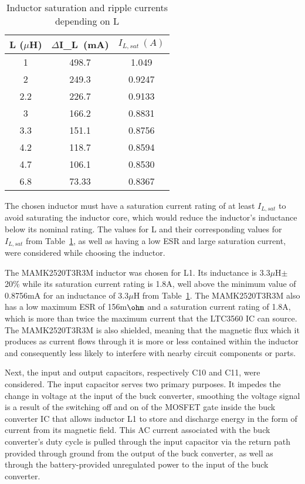 \begin{table}[H]
\centering
\caption{Inductor saturation and ripple currents depending on L}
\label{tab:inductor_value}
\begin{tabular}{|c|c|c|}
\hline
L (${\mu}$H) & ${\Delta}$I_L~(mA) & $I_{L,sat}~(A)$ \\ \hline
1            & 498.7         & 1.049          \\ \hline
2            & 249.3         & 0.9247         \\ \hline
2.2          & 226.7         & 0.9133         \\ \hline
3            & 166.2         & 0.8831         \\ \hline
3.3          & 151.1         & 0.8756         \\ \hline
4.2          & 118.7         & 0.8594         \\ \hline
4.7          & 106.1         & 0.8530         \\ \hline
6.8          & 73.33         & 0.8367         \\ \hline
\end{tabular}
\end{table}

The chosen inductor must have a saturation current rating of at least $I_{L,sat}$ to avoid saturating the inductor core, which would reduce the inductor's inductance below its nominal rating. The values for L and their corresponding values for $I_{L,sat}$ from Table~\ref{tab:inductor_value}, as well as having a low ESR and large saturation current, were considered while choosing the inductor.

The MAMK2520T3R3M inductor was chosen for L1. Its inductance is 3.3$\mu$H$\pm$20\% while its saturation current rating is 1.8A, well above the minimum value of 0.8756mA for an inductance of 3.3$\mu$H from Table~\ref{tab:inductor_value}. The MAMK2520T3R3M also has a low maximum ESR of 156m$\ohm$ and a saturation current rating of 1.8A, which is more than twice the maximum current that the LTC3560 IC can source. The MAMK2520T3R3M is also shielded, meaning that the magnetic flux which it produces as current flows through it is more or less contained within the inductor and consequently less likely to interfere with nearby circuit components or parts.

Next, the input and output capacitors, respectively C10 and C11, were considered. The input capacitor serves two primary purposes. It impedes the change in voltage at the input of the buck converter, \DIFdelbegin {}\DIFdelend smoothing the voltage signal \DIFdelbegin {}\DIFdelend \DIFaddbegin {}\DIFaddend is a result of the switching off and on of the MOSFET gate inside the buck converter IC that allows inductor L1 to store and discharge energy in the form of current from its magnetic field. This AC current associated with the buck converter's duty cycle is pulled through the input capacitor via the return path provided through ground from the output of the buck converter, as well as through the battery-provided unregulated power to the input of the buck converter.

